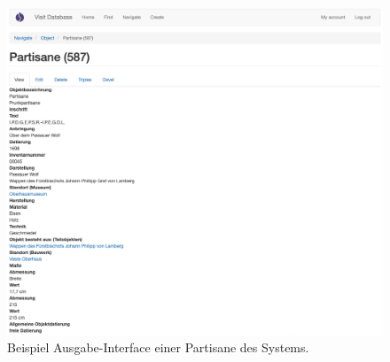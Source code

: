 \begin{figure}[htb]
    \centering
    \includegraphics[width=\textwidth]{Figures/berndl/wisskiViewObject}
    \caption{\label{fig:wisskiViewObject} Beispiel Ausgabe-Interface einer Partisane des \visit \wisski Systems.}
\end{figure}

